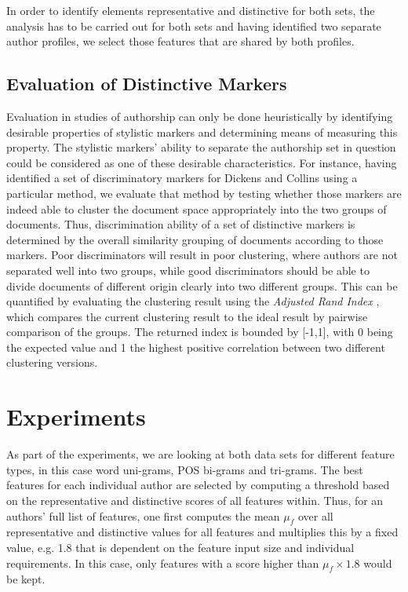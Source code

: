 \documentclass[a4paper,10pt,twoside,fleqn]{article}
\begin{document}
In order to identify elements representative and distinctive for both sets,
the analysis has to be carried out for both sets and having identified
two separate author profiles, we select those features that are shared
by both profiles.

\subsection{Evaluation of Distinctive Markers} \label{sec:evaluation}
Evaluation in studies of authorship can only be done heuristically
by identifying desirable properties of stylistic markers and
determining means of measuring this property.
The stylistic markers' ability to separate the authorship set in
question could be considered as one of these desirable characteristics.
For instance, having identified a set of discriminatory markers
for Dickens and Collins using a particular method, we evaluate
that method by testing whether those markers are indeed able to
cluster the document space appropriately into the two groups of
documents.
Thus, discrimination ability of a set of distinctive markers
is determined by the overall similarity grouping of documents
according to those markers.
Poor discriminators will result in poor clustering, where
authors are not separated well into two groups, while
good discriminators should be able to divide documents of
different origin clearly into two different groups.
This can be quantified by evaluating the clustering result
using the \emph{Adjusted Rand Index} \cite{hubert1985comparing},
which compares the current clustering result to the ideal
result by pairwise comparison of the groups.
The returned index is bounded by [-1,1], with 0 being the
expected value and 1 the highest positive correlation
between two different clustering versions.

\section{Experiments}\label{sec:experiments}
As part of the experiments, we are looking at both data sets
for different feature types, in this case word uni-grams,
POS bi-grams and tri-grams.
The best features for each individual author are selected by
computing a threshold based on the representative and distinctive
scores of all features within.
Thus, for an authors' full list of features, one first computes
the mean $\mu_f$ over all representative and distinctive values
for all features and multiplies this by a fixed value, e.g. 1.8
that is dependent on the feature input size and individual
requirements. In this case, only features with a score higher than
$\mu_f \times 1.8$ would be kept.
\end{document}
